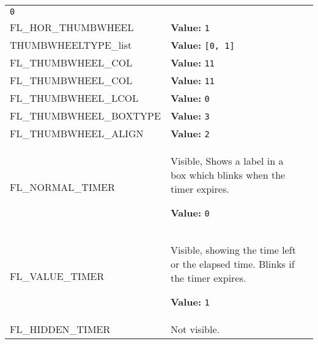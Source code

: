 \begin{longtable}{|p{\varnamewidth}|p{\vardescrwidth}|l}
{\tt 0}&\\
\cline{1-2}
\raggedright F\-L\-\_\-H\-O\-R\-\_\-T\-H\-U\-M\-B\-W\-H\-E\-E\-L\- & \raggedright \textbf{Value:} 
{\tt 1}&\\
\cline{1-2}
\raggedright T\-H\-U\-M\-B\-W\-H\-E\-E\-L\-T\-Y\-P\-E\-\_\-l\-i\-s\-t\- & \raggedright \textbf{Value:} 
{\tt \texttt{[}0\texttt{, }1\texttt{]}}&\\
\cline{1-2}
\raggedright F\-L\-\_\-T\-H\-U\-M\-B\-W\-H\-E\-E\-L\-\_\-C\-O\-L\-1\- & \raggedright \textbf{Value:} 
{\tt 11}&\\
\cline{1-2}
\raggedright F\-L\-\_\-T\-H\-U\-M\-B\-W\-H\-E\-E\-L\-\_\-C\-O\-L\-2\- & \raggedright \textbf{Value:} 
{\tt 11}&\\
\cline{1-2}
\raggedright F\-L\-\_\-T\-H\-U\-M\-B\-W\-H\-E\-E\-L\-\_\-L\-C\-O\-L\- & \raggedright \textbf{Value:} 
{\tt 0}&\\
\cline{1-2}
\raggedright F\-L\-\_\-T\-H\-U\-M\-B\-W\-H\-E\-E\-L\-\_\-B\-O\-X\-T\-Y\-P\-E\- & \raggedright \textbf{Value:} 
{\tt 3}&\\
\cline{1-2}
\raggedright F\-L\-\_\-T\-H\-U\-M\-B\-W\-H\-E\-E\-L\-\_\-A\-L\-I\-G\-N\- & \raggedright \textbf{Value:} 
{\tt 2}&\\
\cline{1-2}
\raggedright F\-L\-\_\-N\-O\-R\-M\-A\-L\-\_\-T\-I\-M\-E\-R\- & \raggedright Visible, Shows a label in a box which blinks when the timer 
          expires.

\textbf{Value:} 
{\tt 0}&\\
\cline{1-2}
\raggedright F\-L\-\_\-V\-A\-L\-U\-E\-\_\-T\-I\-M\-E\-R\- & \raggedright Visible, showing the time left or the elapsed time. Blinks if the
          timer expires.

\textbf{Value:} 
{\tt 1}&\\
\cline{1-2}
\raggedright F\-L\-\_\-H\-I\-D\-D\-E\-N\-\_\-T\-I\-M\-E\-R\- & \raggedright Not visible.


\end{longtable}
